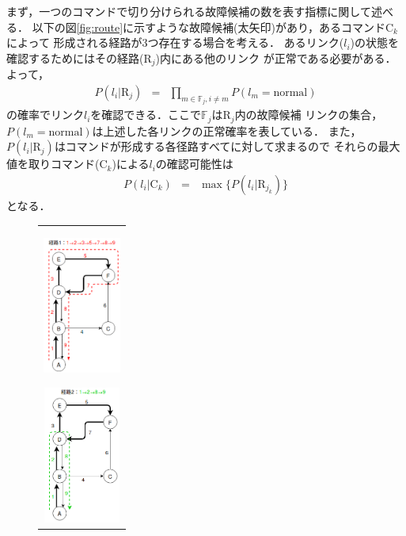 \documentclass[11pt]{jsarticle}%
\begin{document}
\begin{multicols}{2}
 まず，一つのコマンドで切り分けられる故障候補の数を表す指標に関して述べる．
 以下の図\ref{fig:route}に示すような故障候補(太矢印)があり，あるコマンドC$_k$によって
 形成される経路が3つ存在する場合を考える．%
 あるリンク($l_i$)の状態を確認するためにはその経路($\text{R}_j$)内にある他のリンク
 が正常である必要がある．よって，
 \begin{eqnarray}
  P(l_{i} | \text{R}_j) &=& \prod_{m\in\mathbb{F}_j,i\neq m} P(l_{m} = \text{normal})
 \end{eqnarray}
 の確率でリンク$l_i$を確認できる．ここで$\mathbb{F}_j$は$\text{R}_j$内の故障候補
 リンクの集合，$P(l_{m} = \text{normal})$は上述した各リンクの正常確率を表している．
 また，
 $P(l_{i} | \text{R}_j)$はコマンドが形成する各径路すべてに対して求まるので
 それらの最大値を取りコマンド(C$_k$)による$l_i$の確認可能性は
\begin{eqnarray}
  P(l_i|\text{C}_k) &=& \max  \{ P(l_i|\text{R}_{j_k})\}
\end{eqnarray}
となる．
 \begin{figure}[H]
  \centering
     \begin{tabular}{c}
        \begin{minipage}{0.30\hsize}
        \centering
        \includegraphics[height=4.5cm]{../figure/route1.png}
           \label{fig:route1}
        \end{minipage}
        \begin{minipage}{0.30\hsize}
        \centering
        \includegraphics[height=4.5cm]{../figure/route2.png}

\end{minipage}
\end{tabular}
\end{figure}
\end{multicols}
\end{document}
